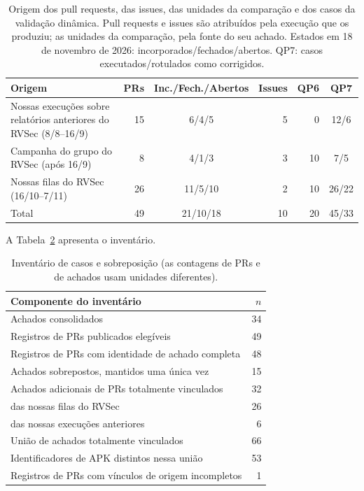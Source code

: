 \documentclass[conference]{IEEEtran}
\begin{document}
\begin{table}[H]
\centering
\caption{Origem dos pull requests, das issues, das unidades da comparação e
dos casos da validação dinâmica. Pull requests e issues são atribuídos pela
execução que os produziu; as unidades da comparação, pela fonte do seu achado.
Estados em 18 de novembro de 2026: incorporados/fechados/abertos. QP7: casos
executados/rotulados como corrigidos.}
\label{tab:origin}
\footnotesize
\setlength{\tabcolsep}{3pt}
\begin{tabular}{p{3.0cm}rcrrc}
\toprule
Origem & PRs & Inc./Fech./Abertos & Issues & QP6 & QP7 \\
\midrule
Nossas execuções sobre relatórios anteriores do RVSec (8/8--16/9) & 15 & 6/4/5 & 5 & 0 & 12/6 \\
Campanha do grupo do RVSec (após 16/9) & 8 & 4/1/3 & 3 & 10 & 7/5 \\
Nossas filas do RVSec (16/10--7/11) & 26 & 11/5/10 & 2 & 10 & 26/22 \\
\midrule
Total & 49 & 21/10/18 & 10 & 20 & 45/33 \\
\bottomrule
\end{tabular}
\end{table}

A Tabela~\ref{tab:sample} apresenta o inventário.

\begin{table}[H]
\centering
\caption{Inventário de casos e sobreposição (as contagens de PRs e de achados usam unidades diferentes).}
\label{tab:sample}
\footnotesize
\begin{tabular}{p{6.1cm}r}
\toprule
Componente do inventário & $n$ \\
\midrule
Achados consolidados & 34 \\
Registros de PRs publicados elegíveis & 49 \\
Registros de PRs com identidade de achado completa & 48 \\
Achados sobrepostos, mantidos uma única vez & 15 \\
Achados adicionais de PRs totalmente vinculados & 32 \\
\quad das nossas filas do RVSec & 26 \\
\quad das nossas execuções anteriores & 6 \\
União de achados totalmente vinculados & 66 \\
Identificadores de APK distintos nessa união & 53 \\
Registros de PRs com vínculos de origem incompletos & 1 \\
\bottomrule
\end{tabular}
\end{table}
\end{document}

